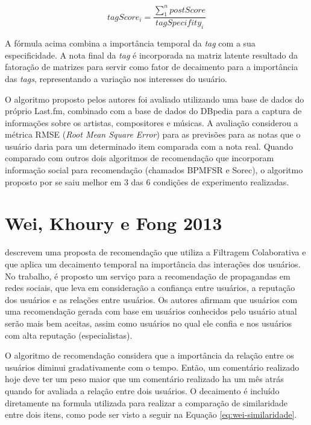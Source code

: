 \begin{equation}
  \label{eq:kushwaha-nota-final}
  tagScore_i = \frac{\sum_1^n{postScore}}{tagSpecifity_i}
\end{equation}

A fórmula acima combina a importância temporal da \textit{tag} com a sua especificidade. A nota final da \textit{tag}
é incorporada na matriz latente resultado da fatoração de matrizes para servir como fator de decaimento para a importância
das \textit{tags}, representando a variação nos interesses do usuário.

O algoritmo proposto pelos autores foi avaliado utilizando uma base de dados do próprio Last.fm, combinado com a base de
dados do DBpedia para a captura de informações sobre os artistas, compositores e músicas. A avaliação considerou a
métrica RMSE (\textit{Root Mean Square Error}) para as previsões para as notas que o usuário daria para um determinado
item comparada com a nota real. Quando comparado com outros dois algoritmos de recomendação que incorporam
informação social para recomendação (chamados BPMFSR e Sorec), o algoritmo proposto por  se saiu melhor em 3
das 6 condições de experimento realizadas.

\section{Wei, Khoury e Fong 2013}

 descrevem uma proposta de recomendação que utiliza a Filtragem Colaborativa e que aplica um
decaimento temporal na importância das interações dos usuários. No trabalho, é proposto um serviço para a recomendação
de propagandas em redes sociais, que leva em consideração a confiança entre usuários, a reputação dos usuários e as
relações entre usuários. Os autores afirmam que usuários com uma recomendação gerada com base em usuários conhecidos
pelo usuário atual serão mais bem aceitas, assim como usuários no qual ele confia e nos usuários com alta reputação
(especialistas).

O algoritmo de recomendação considera que a importância da relação entre os usuários diminui gradativamente com o tempo.
Então, um comentário realizado hoje deve ter um peso maior que um comentário realizado ha um mês atrás quando for
avaliada a relação entre dois usuários. O decaimento é incluído diretamente na formula utilizada para realizar a
comparação de similaridade entre dois itens, como pode ser visto a seguir na Equação \ref{eq:wei-similaridade}.

